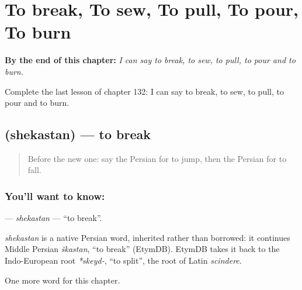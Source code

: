 
\chapter{To break, To sew, To pull, To pour, To burn}
\label{ch:fa-to-break-to-sew-to-pull-to-pour-to-burn}

\begin{chapteropening}
\textbf{By the end of this chapter:} \emph{I can say to break, to sew, to pull, to pour and to burn.}

Complete the last lesson of chapter 132: I can say to break, to sew, to pull, to pour and to burn.
\end{chapteropening}

\section[\texorpdfstring{\fa{شکستن} (shekastan)}{شکستن (shekastan)}]{ (shekastan) — to break}

\label{lesson:FA-C132-shekastan}



\begin{quote}
Before the new one: say the Persian for to jump, then the Persian for to fall.
\end{quote}

\subsection*{You'll want to know: }
\textbf{} — \emph{shekastan} — \textquotedblleft{}to break\textquotedblright{}.

\begin{cousinweb}
\emph{shekastan} is a native Persian word, inherited rather than borrowed: it continues Middle Persian \emph{škastan}, \textquotedblleft{}to break\textquotedblright{} (EtymDB). EtymDB takes it back to the Indo-European root \emph{*skeyd-}, \textquotedblleft{}to split\textquotedblright{}, the root of Latin \emph{scindere}.
\end{cousinweb}

\begin{grammarlens}[title={What you've built}]
One more word for this chapter.
\end{grammarlens}

